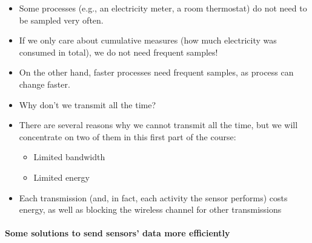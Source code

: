\documentclass[
]{article}
\providecommand{\tightlist}{%
  \setlength{\itemsep}{0pt}\setlength{\parskip}{0pt}}
\begin{document}
\begin{itemize}
\tightlist
\item
  Some processes (e.g., an electricity meter, a room thermostat) do not
  need to be sampled very often.
\item
  If we only care about cumulative measures (how much electricity was
  consumed in total), we do not need frequent samples!
\item
  On the other hand, faster processes need frequent samples, as process
  can change faster.
\item
  Why don't we transmit all the time?
\item
  There are several reasons why we cannot transmit all the time, but we
  will concentrate on two of them in this first part of the course:

  \begin{itemize}
  \tightlist
  \item
    Limited bandwidth
  \item
    Limited energy
  \end{itemize}
\item
  Each transmission (and, in fact, each activity the sensor performs)
  costs energy, as well as blocking the wireless channel for other
  transmissions
\end{itemize}

\paragraph{Some solutions to send sensors' data more
efficiently}\label{some-solutions-to-send-sensors-data-more-efficiently}
\end{document}
